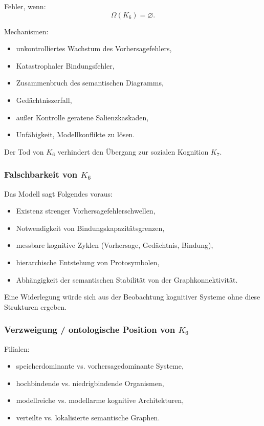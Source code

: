 Fehler, wenn:
\[
\Omega(K_6) = \varnothing.
\]

Mechanismen:
\begin{itemize}
    \item unkontrolliertes Wachstum des Vorhersagefehlers,
    \item Katastrophaler Bindungsfehler,
    \item Zusammenbruch des semantischen Diagramms,
    \item Gedächtniszerfall,
    \item außer Kontrolle geratene Salienzkaskaden,
    \item Unfähigkeit, Modellkonflikte zu lösen.
\end{itemize}

Der Tod von $K_6$ verhindert den Übergang zur sozialen Kognition $K_7$.

\subsubsection{Falschbarkeit von \texorpdfstring{$K_6$}{K_6}}

Das Modell sagt Folgendes voraus:
\begin{itemize}
    \item Existenz strenger Vorhersagefehlerschwellen,
    \item Notwendigkeit von Bindungskapazitätsgrenzen,
    \item messbare kognitive Zyklen (Vorhersage, Gedächtnis, Bindung),
    \item hierarchische Entstehung von Protosymbolen,
    \item Abhängigkeit der semantischen Stabilität von der Graphkonnektivität.
\end{itemize}

Eine Widerlegung würde sich aus der Beobachtung kognitiver Systeme ohne diese Strukturen ergeben.

\subsubsection{Verzweigung / ontologische Position von \texorpdfstring{$K_6$}{K_6}}

Filialen:
\begin{itemize}
    \item speicherdominante vs. vorhersagedominante Systeme,
    \item hochbindende vs. niedrigbindende Organismen,
    \item modellreiche vs. modellarme kognitive Architekturen,
    \item verteilte vs. lokalisierte semantische Graphen.
\end{itemize}

